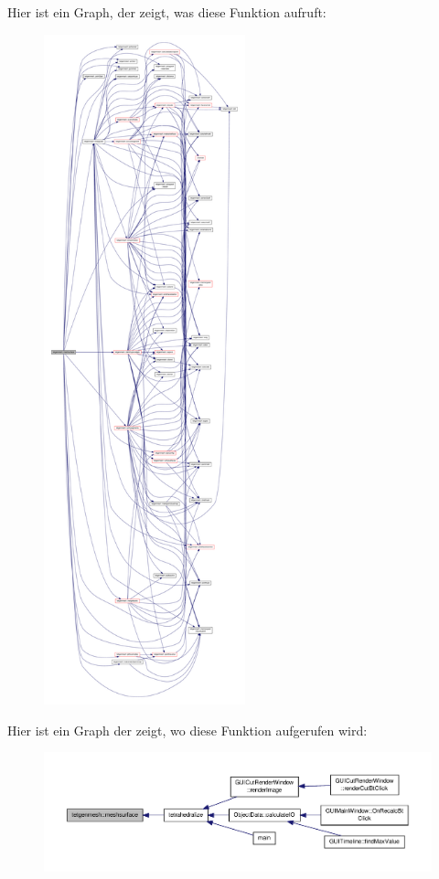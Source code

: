 Hier ist ein Graph, der zeigt, was diese Funktion aufruft\-:
\nopagebreak
\begin{figure}[H]
\begin{center}
\leavevmode
\includegraphics[height=550pt]{classtetgenmesh_a0c51cd3511d2b0ef9d0d45fe8b546b2e_cgraph}
\end{center}
\end{figure}




Hier ist ein Graph der zeigt, wo diese Funktion aufgerufen wird\-:
\nopagebreak
\begin{figure}[H]
\begin{center}
\leavevmode
\includegraphics[width=350pt]{classtetgenmesh_a0c51cd3511d2b0ef9d0d45fe8b546b2e_icgraph}
\end{center}
\end{figure}


